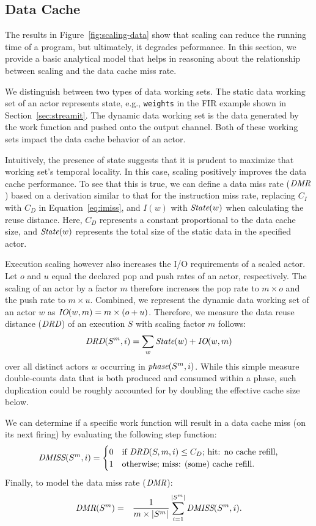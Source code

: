 \subsection{Data Cache}

The results in Figure~\ref{fig:scaling-data} show that scaling can
reduce the running time of a program, but ultimately, it degrades
peformance. In this section, we provide a basic analytical model that
helps in reasoning about the relationship between scaling and the data
cache miss rate. 

We distinguish between two types of data working sets. The static data
working set of an actor represents state, e.g., \texttt{weights} in
the FIR example shown in Section~\ref{sec:streamit}.  The dynamic data
working set is the data generated by the work function and pushed onto
the output channel. Both of these working sets impact the data cache
behavior of an actor.

Intuitively, the presence of state suggests that it is
prudent to maximize that working set's temporal locality. In this
case, scaling positively improves the data cache performance. To see
that this is true, we can define a data miss rate ($\mbox{\it DMR}$) based on
a derivation similar to that for the instruction miss rate, replacing
$C_I$ with $C_D$ in Equation~\ref{eq:imiss}, and $I(w)$ with
$\mbox{\it State}(w)$ when calculating the reuse distance. Here, $C_D$
represents a constant proportional to the data cache size, and
$\mbox{\it State}(w)$ represents the total size of the static data in the
specified actor. 

Execution scaling however also increases the I/O requirements of a
scaled actor. Let $o$ and $u$ equal the declared pop and push rates
of an actor, respectively.  The scaling of an
actor by a factor $m$ therefore increases the pop rate to $m\times o$
and the push rate to $m\times u$. Combined, we represent the dynamic
data working set of an actor $w$ as $\mbox{\it IO}(w, m) =
m\times(o+u)$. Therefore, we measure the data reuse distance ($\mbox{\it DRD}$)
of an execution $S$ with scaling factor $m$ follows:
\[
  \mbox{\it DRD}(S^m,i)=\sum_{w} \mbox{\it State}(w) + \mbox{\it IO}(w,m)
\]
over all distinct actors $w$ occurring in $\mbox{\it phase}(S^m,i)$.  While
this simple measure double-counts data that is both produced and
consumed within a phase, such duplication could be roughly accounted
for by doubling the effective cache size below.  

We can determine if a
specific work function will result in a data cache miss (on its next
firing) by evaluating the following step function:
\begin{equation}
\label{eq:dmiss}
  \mbox{\it DMISS}(S^m,i) =
    \begin{cases}
      0& \text{if $\mbox{\it DRD}(S,m,i) \leq C_D$; hit: no cache refill,}\\
      1& \text{otherwise; miss: (some) cache refill.}
    \end{cases}
\end{equation}
Finally, to model the data miss rate ($\mbox{\it DMR}$):
\begin{eqnarray}
  \label{eq:dmrM}
  \mbox{\it DMR}(S^m) &=& \frac{1}{m \times |S^m|}\sum_{i=1}^{|S^m|} \mbox{\it DMISS}(S^m,i).
\end{eqnarray}

